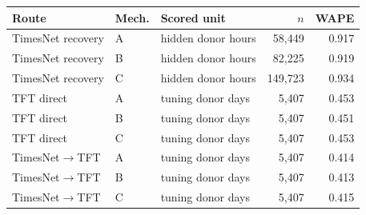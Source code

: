 \begin{tabular}{@{}lllrr@{}}
\toprule
Route & Mech. & Scored unit & $n$ & WAPE \\
\midrule
TimesNet recovery & A & hidden donor hours & 58,449 & 0.917 \\
TimesNet recovery & B & hidden donor hours & 82,225 & 0.919 \\
TimesNet recovery & C & hidden donor hours & 149,723 & 0.934 \\
\midrule
TFT direct & A & tuning donor days & 5,407 & 0.453 \\
TFT direct & B & tuning donor days & 5,407 & 0.451 \\
TFT direct & C & tuning donor days & 5,407 & 0.453 \\
TimesNet$\rightarrow$TFT & A & tuning donor days & 5,407 & 0.414 \\
TimesNet$\rightarrow$TFT & B & tuning donor days & 5,407 & 0.413 \\
TimesNet$\rightarrow$TFT & C & tuning donor days & 5,407 & 0.415 \\
\bottomrule
\end{tabular}
